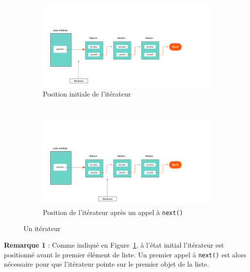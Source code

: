 \documentclass[iutinfo,a4paper,nocorrections,10pt]{ustl-tdtp}
\begin{document}
\begin{figure}[ht!]
 \begin{subfigure}[b]{0.45\textwidth}
                \includegraphics[width=\textwidth]{figs/linked_list_ite}
                \caption{Position initiale de l'itérateur}
                \label{fig:ite1}
        \end{subfigure}%
        \hfill
        ~ %
        \begin{subfigure}[b]{0.45\textwidth}
                \includegraphics[width=\textwidth]{figs/linked_list_ite2}
                \caption{Position de l'itérateur après un appel à \texttt{next()}}
                \label{fig:ite2}
        \end{subfigure}
\caption{Un itérateur}

\label{fig:ite}


\end{figure}


\textbf{Remarque 1} : Comme indiqué en Figure~\ref{fig:ite1}, à l'état initial l'itérateur est positionné avant le premier élément de liste. Un premier appel à \texttt{next()} est alors nécessaire pour que l'itérateur pointe sur le premier objet de la liste.\newline
\end{document}
